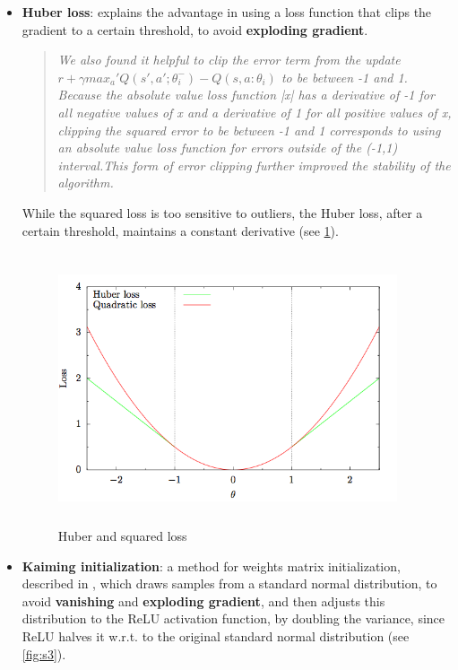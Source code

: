 \begin{itemize}
\item \textbf{Huber loss}: \cite{huber} explains the advantage in using a loss function that clips the gradient to a certain threshold, to avoid \textbf{exploding gradient}.
\begin{quote} 
\centering 
	\textit{We also found it helpful to clip the error term from the update 
	$r + \gamma max_a' Q(s',a'; \theta_i^-) - Q(s,a:\theta_i)$ to be between 
	-1 and 1. Because the absolute value loss function |x| has a derivative of -1
	 for all negative values of x and a derivative of 1 for all positive values of x, 
	 clipping the squared error to be between -1 and 1 corresponds 
	to using an absolute value loss function for errors outside of the (-1,1) 
	interval.This form of error clipping further improved the stability of the algorithm.}
\end{quote}
While the squared loss is too sensitive to outliers, the Huber loss, after a certain threshold, maintains a constant derivative (see \ref{fig:s2}).
\begin{figure}[H] 
\includegraphics[height=80mm, width=100mm, scale=0.5]{chapters/huber.png}
\centering
\caption{Huber and squared loss}
\label{fig:s2} 
\end{figure}
\item \textbf{Kaiming initialization}: a method for weights matrix initialization, described in \cite{kaiming}, which draws samples from a standard normal distribution, to avoid \textbf{vanishing} and \textbf{exploding gradient}, and then adjusts this distribution to the ReLU activation function, by doubling the variance, since ReLU halves it w.r.t. to the original standard normal distribution (see \ref{fig:s3}).
\begin{figure}[H] 

\end{figure}
\end{itemize}
